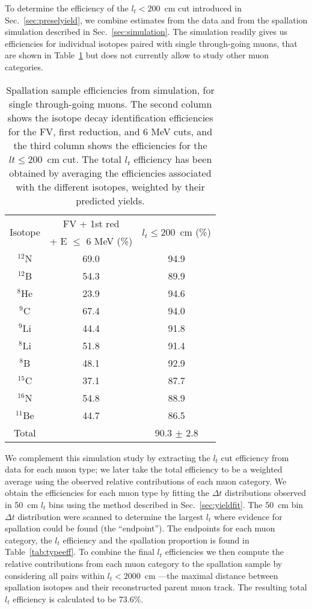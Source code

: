 To determine the efficiency of the $l_t < 200$~cm cut introduced in Sec.~\ref{sec:preselyield}, we combine estimates from the data and from the spallation simulation described in Sec.~\ref{sec:simulation}. The simulation readily gives us efficiencies for individual isotopes paired with single through-going muons, that are shown in Table~\ref{tab:spal_eff_simu} but does not currently allow to study other muon categories. 


\begin{table}[t]
    \centering
        \caption{Spallation sample efficiencies from simulation, for single through-going muons. The second column shows the isotope decay identification efficiencies for the FV, first reduction, and 6 MeV cuts, and the third column shows the efficiencies for the $lt \leq 200$~cm cut. The total $l_t$ efficiency has been obtained by averaging the efficiencies associated with the different isotopes, weighted by their predicted yields.}
    \begin{tabular}{ ccc }
    \toprule \multirow{2}{*}{Isotope}  & FV + 1st red & \multirow{2}{*}{$l_t \leq 200$~cm (\%)}\\
    & + E $\leq$ 6 MeV (\%) &  \\\hline
$\mathrm{^{12}N}$ & 69.0 & 94.9 \\ 
$\mathrm{^{12}B}$ & 54.3 & 89.9 \\ 
$\mathrm{^{8}He}$ & 23.9 & 94.6 \\ 
$\mathrm{^{9}C}$ & 67.4 & 94.0 \\ 
$\mathrm{^{9}Li}$ & 44.4 & 91.8 \\ 
$\mathrm{^{8}Li}$ & 51.8 & 91.4 \\ 
$\mathrm{^{8}B}$ & 48.1 & 92.9 \\ 
$\mathrm{^{15}C}$ & 37.1 & 87.7 \\ 
$\mathrm{^{16}N}$ & 54.8 & 88.9 \\ 
$\mathrm{^{11}Be}$ & 44.7 & 86.5 \\
\hline
Total & & 90.3 $\pm$ 2.8\\
   \bottomrule        %
   \end{tabular}
    \label{tab:spal_eff_simu}
\end{table}

We complement this simulation study by extracting the $l_t$ cut efficiency from data for each muon type; we later take the total efficiency to be a weighted average using the observed relative contributions of each muon category.
We obtain the efficiencies for each muon type by fitting the $\Delta t$ distributions observed in 50~cm $l_t$ bins using the method described in Sec.~\ref{sec:yieldfit}. The 50~cm bin $\Delta t$ distribution were scanned to determine the largest $l_t$ where evidence for spallation could be found (the “endpoint”). The endpoints for each muon category, the $l_t$ efficiency and the spallation proportion is found in Table~\ref{tab:typeeff}. To combine the final $l_t$ efficiencies we then compute the relative contributions from each muon category to the spallation sample by considering all pairs within $l_t < 2000$~cm ---the maximal distance between spallation isotopes and their reconstructed parent muon track. The resulting total $l_t$ efficiency is calculated to be 73.6\%.

